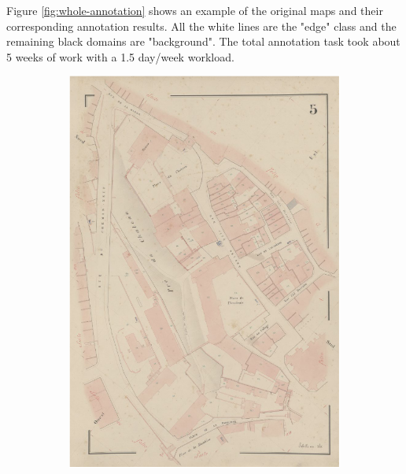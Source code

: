 \documentclass[12pt]{article}
\begin{document}
Figure \ref{fig:whole-annotation} shows an example of the original maps and their corresponding annotation results. All the white lines are the "edge" class and the remaining black domains are "background". The total annotation task took about 5 weeks of work with a 1.5 day/week workload.

\begin{figure}[H]
    
	\begin{subfigure}[b]{0.5\textwidth}
	    \centering
		\includegraphics[width=1\linewidth]{images/img1.png}  
		\label{fig:}
	\end{subfigure}
	\begin{subfigure}[b]{.5\textwidth}

\end{subfigure}
\end{figure}
\end{document}
